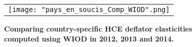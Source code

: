 \documentclass[11pt,a4paper]{article} %
\begin{document}
\begin{figure}[H]
	\centering
	\caption{\footnotesize{\textbf{Comparing country-specific HCE deflator elasticities computed using WIOD in 2012, 2013 and 2014.}}}
	\begin{tabular}{c}
		\texttt{[image: "pays\_en\_soucis\_Comp\_WIOD".png]}\\
	\end{tabular}
	\label{fig:pays_soucis_WIOD}
\end{figure}
\end{document}
